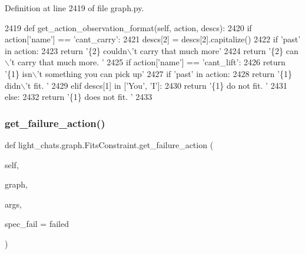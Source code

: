 Definition at line 2419 of file graph.\+py.


\begin{DoxyCode}
2419     \textcolor{keyword}{def }get\_action\_observation\_format(self, action, descs):
2420         \textcolor{keywordflow}{if} action[\textcolor{stringliteral}{'name'}] == \textcolor{stringliteral}{'cant\_carry'}:
2421             descs[2] = descs[2].capitalize()
2422             \textcolor{keywordflow}{if} \textcolor{stringliteral}{'past'} \textcolor{keywordflow}{in} action:
2423                 \textcolor{keywordflow}{return} \textcolor{stringliteral}{'\{2\} couldn\(\backslash\)'t carry that much more'}
2424             \textcolor{keywordflow}{return} \textcolor{stringliteral}{'\{2\} can\(\backslash\)'t carry that much more. '}
2425         \textcolor{keywordflow}{if} action[\textcolor{stringliteral}{'name'}] == \textcolor{stringliteral}{'cant\_lift'}:
2426             \textcolor{keywordflow}{return} \textcolor{stringliteral}{'\{1\} isn\(\backslash\)'t something you can pick up'}
2427         \textcolor{keywordflow}{if} \textcolor{stringliteral}{'past'} \textcolor{keywordflow}{in} action:
2428             \textcolor{keywordflow}{return} \textcolor{stringliteral}{'\{1\} didn\(\backslash\)'t fit. '}
2429         \textcolor{keywordflow}{elif} descs[1] \textcolor{keywordflow}{in} [\textcolor{stringliteral}{'You'}, \textcolor{stringliteral}{'I'}]:
2430             \textcolor{keywordflow}{return} \textcolor{stringliteral}{'\{1\} do not fit. '}
2431         \textcolor{keywordflow}{else}:
2432             \textcolor{keywordflow}{return} \textcolor{stringliteral}{'\{1\} does not fit. '}
2433 
\end{DoxyCode}
\mbox{\label{classlight__chats_1_1graph_1_1FitsConstraint_a41bb59f13bde75e990d25d86283f3afe}} 
\subsubsection{\texorpdfstring{get\+\_\+failure\+\_\+action()}{get\_failure\_action()}}
{\footnotesize\ttfamily def light\+\_\+chats.\+graph.\+Fits\+Constraint.\+get\+\_\+failure\+\_\+action (\begin{DoxyParamCaption}\item[{}]{self,  }\item[{}]{graph,  }\item[{}]{args,  }\item[{}]{spec\+\_\+fail = {\ttfamily \textquotesingle{}failed\textquotesingle{}} }\end{DoxyParamCaption})}



